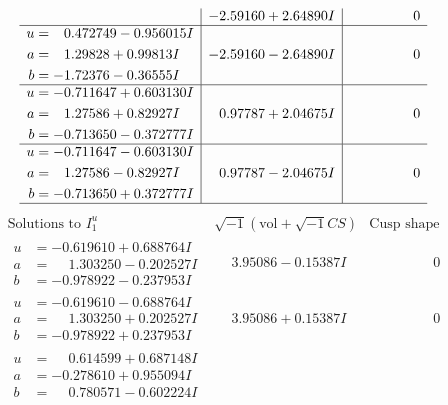 \documentclass[1p]{elsarticle_modified}
\theoremstyle{definition}
\newcommand{\I}{\sqrt{-1}}
\begin{document}
$$\begin{array}{c|c|c}
 & -2.59160 + 2.64890 I & \phantom{-0.000000 } 0 \\ \hline\begin{aligned}
u &= \phantom{-}0.472749 - 0.956015 I \\
a &= \phantom{-}1.29828 + 0.99813 I \\
b &= -1.72376 - 0.36555 I\end{aligned}
 & -2.59160 - 2.64890 I & \phantom{-0.000000 } 0 \\ \hline\begin{aligned}
u &= -0.711647 + 0.603130 I \\
a &= \phantom{-}1.27586 + 0.82927 I \\
b &= -0.713650 - 0.372777 I\end{aligned}
 & \phantom{-}0.97787 + 2.04675 I & \phantom{-0.000000 } 0 \\ \hline\begin{aligned}
u &= -0.711647 - 0.603130 I \\
a &= \phantom{-}1.27586 - 0.82927 I \\
b &= -0.713650 + 0.372777 I\end{aligned}
 & \phantom{-}0.97787 - 2.04675 I & \phantom{-0.000000 } 0\\
 \hline 
 \end{array}$$\newpage$$\begin{array}{c|c|c}  
\text{Solutions to }I^u_{1}& \I (\text{vol} + \sqrt{-1}CS) & \text{Cusp shape}\\
 \hline 
\begin{aligned}
u &= -0.619610 + 0.688764 I \\
a &= \phantom{-}1.303250 - 0.202527 I \\
b &= -0.978922 - 0.237953 I\end{aligned}
 & \phantom{-}3.95086 - 0.15387 I & \phantom{-0.000000 } 0 \\ \hline\begin{aligned}
u &= -0.619610 - 0.688764 I \\
a &= \phantom{-}1.303250 + 0.202527 I \\
b &= -0.978922 + 0.237953 I\end{aligned}
 & \phantom{-}3.95086 + 0.15387 I & \phantom{-0.000000 } 0 \\ \hline\begin{aligned}
u &= \phantom{-}0.614599 + 0.687148 I \\
a &= -0.278610 + 0.955094 I \\
b &= \phantom{-}0.780571 - 0.602224 I\end{aligned}

\end{array}$$
\end{document}
